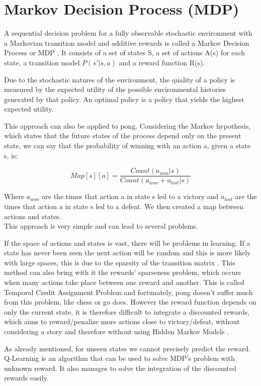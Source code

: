 \section{Markov Decision Process (MDP)}

A sequential decision problem for a fully observable stochastic environment with a Markovian transition model and additive rewards is called a Markov Decision Process or MDP \cite{russell2002artificial}.
It consists of a set of states S, a set of actions A(s) for each state, a transition model
$P(s' | s, a)$ and a reward function R(s).

Due to the stochastic natures of the environment, the quality of a policy is measured by the expected utility of the possible environmental histories generated by that policy. An optimal policy is a policy that yields the highest expected utility.

This approach can also be applied to pong.
Considering the Markov hypothesis, which states that the future states of the process depend only on the present state, we can say that the probability of winning with an action a, given a state s, is:

\[ { Map[s][a] = \frac{ Count(a_{won} | s) }{ Count(a_{won} + a_{lost} | s) } } \]

Where $a_{won}$ are the times that action a in state s led to a victory and
$a_{lost}$ are the times that action a in state s led to a defeat.
We then created a map between actions and states. \\

This approach is very simple and can lead to several problems.

If the space of actions and states is vast, there will be problems in learning.
If a state has never been seen the next action will be random and this is more
likely with large spaces, this is due to the sparsity of the transition matrix \cite{silver2015}.
This method can also bring with it the rewards' sparseness problem, which occurs when many
actions take place between one reward and another. This is called Temporal Credit Assignment Problem \cite{sutton1984temporal}
and fortunately, pong doesn't suffer much from this problem, like chess or go does.
However the reward function depends on only the current state, it is
therefore difficult to integrate a discounted rewards, which aims to reward/penalize
more actions close to victory/defeat, without considering a story and therefore
without using Hidden Markov Models \cite{silver2015}.

As already mentioned, for unseen states we cannot precisely predict the reward.
Q-Learning is an algorithm that can be used to solve MDP's problem with unknown reward.
It also manages to solve the integration of the discounted rewards easily.
